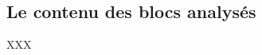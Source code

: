 \documentclass[12pt, a4paper]{article}
\begin{document}

\subsection{Le contenu des blocs analysés}

XXX
\end{document}
